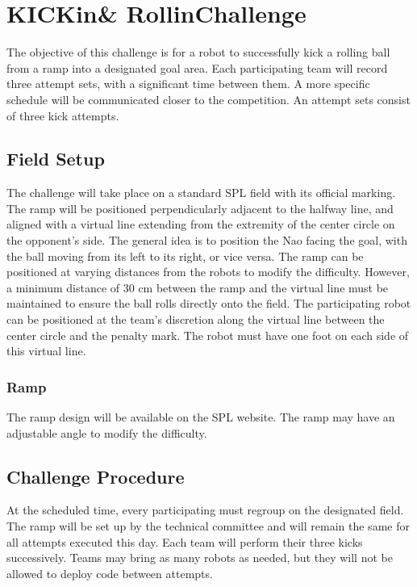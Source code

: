 \section{KICKin\textquotesingle \& Rollin\textquotesingle Challenge}

The objective of this challenge is for a robot to successfully kick a rolling ball from a ramp into a designated goal area. 
Each participating team will record three attempt sets, with a significant time between them.
A more specific schedule will be communicated closer to the competition.
An attempt sets consist of three kick attempts. 

\subsection{Field Setup}

The challenge will take place on a standard SPL field with its official marking. 
The ramp will be positioned perpendicularly adjacent to the halfway line, and aligned with a virtual line extending from the extremity of the center circle on the opponent's side.
The general idea is to position the Nao facing the goal, with the ball moving from its left to its right, or vice versa.
The ramp can be positioned at varying distances from the robots to modify the difficulty.
However, a minimum distance of 30 cm between the ramp and the virtual line must be maintained to ensure the ball rolls directly onto the field.
The participating robot can be positioned at the team’s discretion along the virtual line between the center circle and the penalty mark.
The robot must have one foot on each side of this virtual line.

\subsubsection{Ramp}

The ramp design will be available on the SPL website.
The ramp may have an adjustable angle to modify the difficulty.


\subsection{Challenge Procedure}

At the scheduled time, every participating must regroup on the designated field. 
The ramp will be set up by the technical committee and will remain the same for all attempts executed this day.
Each team will perform their three kicks successively.
Teams may bring as many robots as needed, but they will not be allowed to deploy code between attempts.

